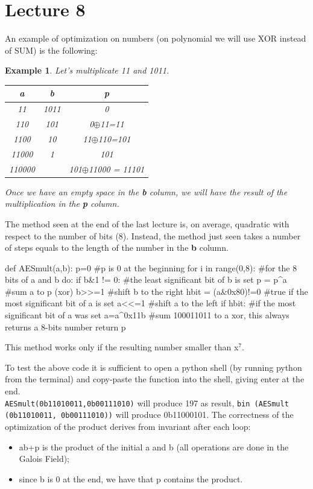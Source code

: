 \documentclass[a4paper, 12pt]{report}
\newtheorem{example}{\textbf{Example}}
\begin{document}
\chapter*{Lecture 8}
An example of optimization on numbers (on polynomial we will use XOR instead of SUM) is the following:
\begin{example}
	Let's multiplicate 11 and 1011.
	\begin{table}[H]
		\centering
		\begin{tabular}{|c|c|c|}
			\hline
			\textbf{a} & \textbf{b} & \textbf{p} \\ \hline
			11 & 1011 & 0\\
			110 & 101 & 0$\oplus$11=11\\
			1100 & 10 & 11$\oplus$110=101\\
			11000 & 1 & 101\\
			110000 & & 101$\oplus$11000 = 11101\\
			\hline
		\end{tabular}
	\end{table}
	Once we have an empty space in the \textbf{b} column, we will have the result of the multiplication in the \textbf{p} column.
\end{example}

The method seen at the end of the last lecture is, on average, quadratic with respect to the number of bits (8). Instead, the method just seen takes a number of steps equals to the length of the number in the \textbf{b} column.

\begin{python}
	def AESmult(a,b):
		p=0										#p is 0 at  the beginning
		for i in range(0,8):	#for the 8 bits of a and b do:
			if b&1 != 0:				#the least significant bit of b is set
				p = p^a						#sum a to p (xor)
			b>>=1								#shift b to the right
			hbit = (a&0x80)!=0	#true if the most significant bit of a is set
			a<<=1								#shift a to the left
			if hbit:						#if the most significant bit of a was set
				a=a^0x11b					#sum 100011011 to a xor, this always  returns a 8-bits number
		return p
\end{python}
This method works only if the resulting number smaller than x$^7$.

To test the above code it is sufficient to open a python shell (by running python from the terminal) and copy-paste the function into the shell, giving enter at the end.\\
\texttt{AESmult(0b11010011,0b00111010)} will produce 197 as result, \texttt{bin (AESmult (0b11010011, 0b00111010))} will produce 0b11000101.
\newpage
The correctness of the optimization of the product derives from invariant after each loop:
\begin{itemize}
	\item ab+p is the product of the initial a and b (all operations are done in the Galois Field);
	\item since b is 0 at the end, we have that p contains the product.
\end{itemize}
\end{document}
